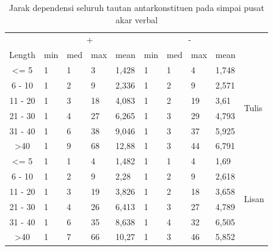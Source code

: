\documentclass[10pt, a4paper, conference, compsocconf]{IEEEtran}
\begin{document}
\begin{table}
\begin{center}
\tiny
\caption{Jarak dependensi seluruh tautan antarkonstituen pada simpai pusat akar verbal}  \label{tab:deskriptif-konstituenpusat}
\begin{tabular}{c l l l l l l l l l}
\hline
 & \multicolumn{4}{c}{+} & \multicolumn{4}{c}{-} & \\  \cline{2-9}  
Length & min 	& med	& max 	& mean 	& min 	& med 	& max 	& mean 	& \\ \cline{1-10}  
\textless= 5 	& 1 		& 1 		& 3	 	& 1,428 	& 1 		& 1		& 4	 	& 1,748 	&\multirow{6}{*}{Tulis}\\
6 - 10 		& 1 		& 2		& 9	 	& 2,336 	& 1 		& 2	 	& 9	 	& 2,571 	& 	\\
11 - 20 		& 1 		& 3	 	& 18	 	& 4,083	& 1 		& 2	 	& 19	 	& 3,61 	& 	\\
21 - 30 		& 1 		& 4	 	& 27	 	& 6,265	& 1 		& 3 		& 29		& 4,793 	& 	\\ 
31 - 40 		& 1	 	& 6	 	& 38		& 9,046 	& 1 		& 3 		& 37		& 5,925 	& 	\\
\textgreater 40 	& 1	 	& 9		& 68	 	& 12,88 	& 1 		& 3 		& 44		& 6,791 	& 	\\ 
\hline
\textless= 5 	& 1 		& 1 		& 4	 	& 1,482 	& 1 		& 1	 	& 4		& 1,69 	& \multirow{6}{*}{Lisan}\\
6 - 10 		& 1 		& 2		& 9	 	& 2,28 	& 1 		& 2		& 9		& 2,618 	& \\
11 - 20 		& 1 		& 3 		& 19	 	& 3,826 	& 1 		& 2 		& 18		& 3,658 	& \\
21 - 30 		& 1	 	& 4	 	& 26	 	& 6,413	& 1 		& 3		& 27		& 4,789 	& \\ 
31 - 40 		& 1	 	& 6	 	& 35		& 8,638 	& 1 		& 4		& 32		& 6,505 	& \\
\textgreater 40 	& 1	 	& 7		& 66	 	& 10,27 	& 1	 	& 3		& 46		& 5,852 	& \\ 
\hline
\end{tabular}
\end{center}
\end{table}
\end{document}
